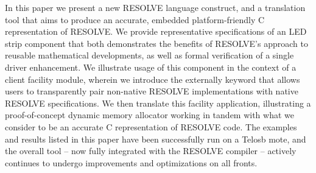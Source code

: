 In this paper we present a new RESOLVE language construct, and a translation tool that aims to produce an accurate, embedded platform-friendly C representation of RESOLVE. We provide representative specifications of an LED strip component that both demonstrates the benefits of RESOLVE's approach to reusable mathematical developments, as well as formal verification of a single driver enhancement. We illustrate usage of this component in the context of a client facility module, wherein we introduce the externally keyword that allows users to transparently pair non-native RESOLVE implementations with native RESOLVE specifications. We then translate this facility application, illustrating a proof-of-concept dynamic memory allocator working in tandem with what we consider to be an accurate C representation of RESOLVE code. The examples and results listed in this paper have been successfully run on a Telosb mote, and the overall tool -- now fully integrated with the RESOLVE compiler -- actively continues to undergo improvements and optimizations on all fronts.
